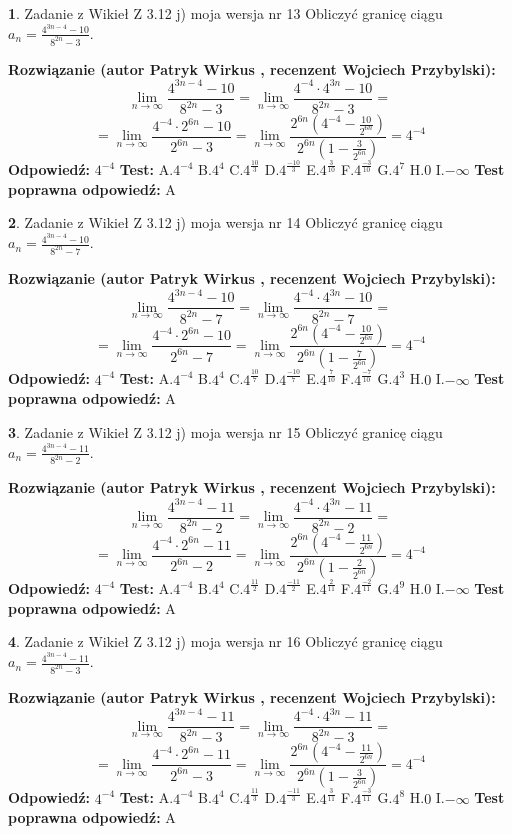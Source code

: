 \documentclass[12pt, a4paper]{article}
\theoremstyle{definition} %
\newtheorem{zad}{}
\newcommand{\zadStart}[1]{\begin{zad}#1\newline}
\newcommand{\zadStop}{\end{zad}}
\newcommand{\rozwStart}[2]{\noindent \textbf{Rozwiązanie (autor #1 , recenzent #2): }\newline}
\newcommand{\rozwStop}{\newline}
\newcommand{\odpStart}{\noindent \textbf{Odpowiedź:}\newline}
\newcommand{\odpStop}{\newline}
\newcommand{\testStart}{\noindent \textbf{Test:}\newline}
\newcommand{\testStop}{\newline}
\newcommand{\kluczStart}{\noindent \textbf{Test poprawna odpowiedź:}\newline}
\newcommand{\kluczStop}{\newline}
\begin{document}
\zadStart{Zadanie z Wikieł Z 3.12 j) moja wersja nr 13}
Obliczyć granicę ciągu $a_{n}=\frac{4^{3n-4}-10}{8^{2n}-3}$.
\zadStop
\rozwStart{Patryk Wirkus}{Wojciech Przybylski}
$$\lim\limits_{n\to\infty}\frac{4^{3n-4}-10}{8^{2n}-3}= \lim\limits_{n\to\infty}\frac{4^{-4} \cdot 4^{3n}-10}{8^{2n}-3}=$$
$$= \lim\limits_{n\to\infty}\frac{4^{-4} \cdot 2^{6n}-10}{2^{6n}-3}= \lim\limits_{n\to\infty}\frac{2^{6n}(4^{-4} - \frac{10}{2^{6n}})}{2^{6n}(1-\frac{3}{2^{6n}})}= 4^{-4}$$
\rozwStop
\odpStart
$4^{-4}$
\odpStop
\testStart
A.$4^{-4}$
B.$4^{4}$
C.$4^{\frac{10}{3}}$
D.$4^{\frac{-10}{3}}$
E.$4^{\frac{3}{10}}$
F.$4^{\frac{-3}{10}}$
G.$4^{7}$
H.$0$
I.$-\infty$
\testStop
\kluczStart
A
\kluczStop



\zadStart{Zadanie z Wikieł Z 3.12 j) moja wersja nr 14}
Obliczyć granicę ciągu $a_{n}=\frac{4^{3n-4}-10}{8^{2n}-7}$.
\zadStop
\rozwStart{Patryk Wirkus}{Wojciech Przybylski}
$$\lim\limits_{n\to\infty}\frac{4^{3n-4}-10}{8^{2n}-7}= \lim\limits_{n\to\infty}\frac{4^{-4} \cdot 4^{3n}-10}{8^{2n}-7}=$$
$$= \lim\limits_{n\to\infty}\frac{4^{-4} \cdot 2^{6n}-10}{2^{6n}-7}= \lim\limits_{n\to\infty}\frac{2^{6n}(4^{-4} - \frac{10}{2^{6n}})}{2^{6n}(1-\frac{7}{2^{6n}})}= 4^{-4}$$
\rozwStop
\odpStart
$4^{-4}$
\odpStop
\testStart
A.$4^{-4}$
B.$4^{4}$
C.$4^{\frac{10}{7}}$
D.$4^{\frac{-10}{7}}$
E.$4^{\frac{7}{10}}$
F.$4^{\frac{-7}{10}}$
G.$4^{3}$
H.$0$
I.$-\infty$
\testStop
\kluczStart
A
\kluczStop



\zadStart{Zadanie z Wikieł Z 3.12 j) moja wersja nr 15}
Obliczyć granicę ciągu $a_{n}=\frac{4^{3n-4}-11}{8^{2n}-2}$.
\zadStop
\rozwStart{Patryk Wirkus}{Wojciech Przybylski}
$$\lim\limits_{n\to\infty}\frac{4^{3n-4}-11}{8^{2n}-2}= \lim\limits_{n\to\infty}\frac{4^{-4} \cdot 4^{3n}-11}{8^{2n}-2}=$$
$$= \lim\limits_{n\to\infty}\frac{4^{-4} \cdot 2^{6n}-11}{2^{6n}-2}= \lim\limits_{n\to\infty}\frac{2^{6n}(4^{-4} - \frac{11}{2^{6n}})}{2^{6n}(1-\frac{2}{2^{6n}})}= 4^{-4}$$
\rozwStop
\odpStart
$4^{-4}$
\odpStop
\testStart
A.$4^{-4}$
B.$4^{4}$
C.$4^{\frac{11}{2}}$
D.$4^{\frac{-11}{2}}$
E.$4^{\frac{2}{11}}$
F.$4^{\frac{-2}{11}}$
G.$4^{9}$
H.$0$
I.$-\infty$
\testStop
\kluczStart
A
\kluczStop



\zadStart{Zadanie z Wikieł Z 3.12 j) moja wersja nr 16}
Obliczyć granicę ciągu $a_{n}=\frac{4^{3n-4}-11}{8^{2n}-3}$.
\zadStop
\rozwStart{Patryk Wirkus}{Wojciech Przybylski}
$$\lim\limits_{n\to\infty}\frac{4^{3n-4}-11}{8^{2n}-3}= \lim\limits_{n\to\infty}\frac{4^{-4} \cdot 4^{3n}-11}{8^{2n}-3}=$$
$$= \lim\limits_{n\to\infty}\frac{4^{-4} \cdot 2^{6n}-11}{2^{6n}-3}= \lim\limits_{n\to\infty}\frac{2^{6n}(4^{-4} - \frac{11}{2^{6n}})}{2^{6n}(1-\frac{3}{2^{6n}})}= 4^{-4}$$
\rozwStop
\odpStart
$4^{-4}$
\odpStop
\testStart
A.$4^{-4}$
B.$4^{4}$
C.$4^{\frac{11}{3}}$
D.$4^{\frac{-11}{3}}$
E.$4^{\frac{3}{11}}$
F.$4^{\frac{-3}{11}}$
G.$4^{8}$
H.$0$
I.$-\infty$
\testStop
\kluczStart
A
\kluczStop
\end{document}
